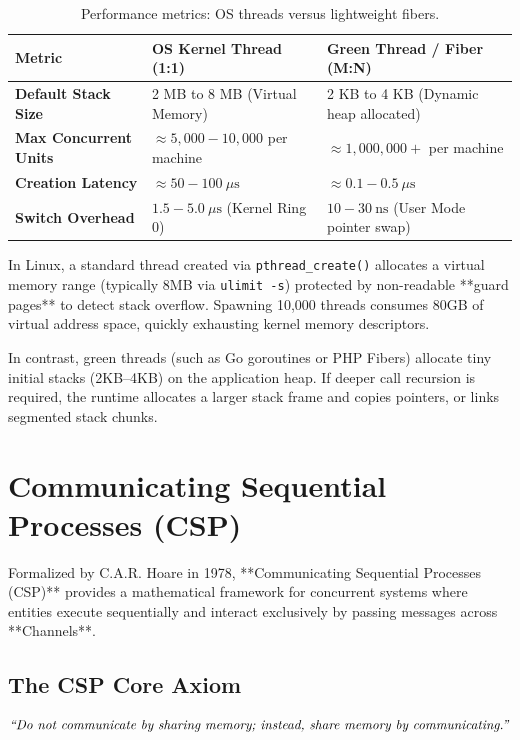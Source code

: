 \begin{table}[htbp]
\centering
\small\sffamily
\begin{tabular}{@{}lll@{}}
\toprule
\textbf{Metric} & \textbf{OS Kernel Thread (1:1)} & \textbf{Green Thread / Fiber (M:N)} \\ \midrule
\textbf{Default Stack Size} & 2 MB to 8 MB (Virtual Memory) & 2 KB to 4 KB (Dynamic heap allocated) \\
\textbf{Max Concurrent Units} & $\approx 5,000 - 10,000$ per machine & $\approx 1,000,000+$ per machine \\
\textbf{Creation Latency} & $\approx 50 - 100\ \mu\text{s}$ & $\approx 0.1 - 0.5\ \mu\text{s}$ \\
\textbf{Switch Overhead} & $1.5 - 5.0\ \mu\text{s}$ (Kernel Ring 0) & $10 - 30\ \text{ns}$ (User Mode pointer swap) \\ \bottomrule
\end{tabular}
\caption{Performance metrics: OS threads versus lightweight fibers.}
\label{tab:thread-comparison}
\end{table}

In Linux, a standard thread created via \texttt{pthread\_create()} allocates a virtual memory range (typically 8MB via \texttt{ulimit -s}) protected by non-readable **guard pages** to detect stack overflow. Spawning 10,000 threads consumes 80GB of virtual address space, quickly exhausting kernel memory descriptors.

In contrast, green threads (such as Go goroutines or PHP Fibers) allocate tiny initial stacks (2KB--4KB) on the application heap. If deeper call recursion is required, the runtime allocates a larger stack frame and copies pointers, or links segmented stack chunks.

\section{Communicating Sequential Processes (CSP)}

Formalized by C.A.R. Hoare in 1978, **Communicating Sequential Processes (CSP)** provides a mathematical framework for concurrent systems where entities execute sequentially and interact exclusively by passing messages across **Channels**.

\subsection{The CSP Core Axiom}
$$\text{\textit{``Do not communicate by sharing memory; instead, share memory by communicating.''}}$$

